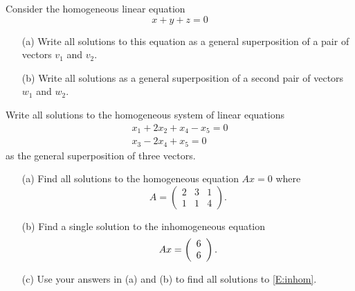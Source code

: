 \documentclass{ximera}
\begin{document}
\EXER

\TEXER

\begin{exercise} \label{c4.4.1}
Consider the homogeneous linear equation
\[
x+y+z = 0
\]
\begin{enumerate}
\item[(a)]  Write all solutions to this equation as a general
superposition of a pair of vectors $v_1$ and $v_2$.
\item[(b)]  Write all solutions as a general superposition of
a second pair of vectors $w_1$ and $w_2$.
\end{enumerate}
\end{exercise}

\begin{exercise} \label{c4.4.2}
Write all solutions to the homogeneous system of linear
equations
\begin{eqnarray*}
x_1+2x_2+x_4-x_5 = 0\\
x_3-2x_4+x_5 = 0
\end{eqnarray*}
as the general superposition of three vectors.
\end{exercise}

\begin{exercise} \label{c4.4.3}
\begin{itemize}
\item[(a)] Find all solutions to the homogeneous equation
$Ax=0$ where
\[
A = \left(\begin{array}{ccc} 2 & 3 & 1 \\ 1 & 1 & 4 \end{array}
\right).
\]
\item[(b)] Find a single solution to the inhomogeneous equation
\begin{equation}  \label{E:inhom}
Ax =\left(\begin{array}{r} 6 \\ 6\end{array}\right).
\end{equation}
\item[(c)] Use your answers in (a) and (b) to find all solutions
to \eqref{E:inhom}.
\end{itemize}
\end{exercise}
\end{document}
